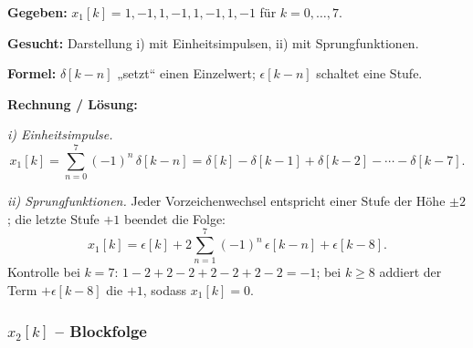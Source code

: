 \begin{beispiel}

\textbf{Gegeben:} $x_1[k]=1,-1,1,-1,1,-1,1,-1$ für $k=0,\ldots,7$.

\textbf{Gesucht:} Darstellung i) mit Einheitsimpulsen, ii) mit Sprungfunktionen.

\textbf{Formel:} $\delta[k-n]$ „setzt`` einen Einzelwert; $\epsilon[k-n]$ schaltet
eine Stufe.

\textbf{Rechnung / Lösung:}

\emph{i) Einheitsimpulse.}
$$
x_1[k] = \sum_{n=0}^{7} (-1)^n\,\delta[k-n]
= \delta[k] - \delta[k-1] + \delta[k-2] - \cdots - \delta[k-7].
$$

\emph{ii) Sprungfunktionen.} Jeder Vorzeichenwechsel entspricht einer Stufe der
Höhe $\pm 2$; die letzte Stufe $+1$ beendet die Folge:
$$
x_1[k] = \epsilon[k] + 2\sum_{n=1}^{7} (-1)^{n}\,\epsilon[k-n] + \epsilon[k-8].
$$
Kontrolle bei $k=7$: $1 - 2 + 2 - 2 + 2 - 2 + 2 - 2 = -1$; bei $k\geq 8$ addiert
der Term $+\epsilon[k-8]$ die $+1$, sodass $x_1[k]=0$. \checkmark

\begin{center}
\end{center}
\end{beispiel}

\subsubsection*{$x_2[k]$ -- Blockfolge}

